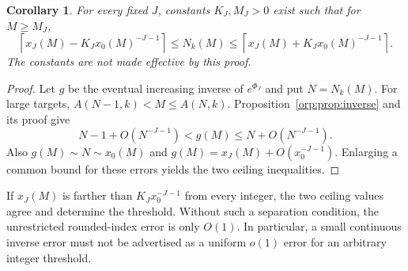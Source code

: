 \documentclass[11pt]{article}
\newtheorem{corollary}[theorem]{Corollary}
\theoremstyle{remark}\newtheorem{remark}[theorem]{Remark}
\begin{document}
\begin{corollary}\label{orp:cor:threshold}
For every fixed $J$, constants $K_J,M_J>0$ exist such that for $M\ge M_J$,
\begin{equation}\label{orp:eq:threshold}
 \left\lceil x_J(M)-K_Jx_0(M)^{-J-1}\right\rceil
 \le N_k(M)\le
 \left\lceil x_J(M)+K_Jx_0(M)^{-J-1}\right\rceil.
\end{equation}
The constants are not made effective by this proof.
\end{corollary}
\begin{proof}
Let $g$ be the eventual increasing inverse of $e^{\Phi_J}$ and put $N=N_k(M)$. For large targets, $A(N-1,k)<M\le A(N,k)$. Proposition~\ref{orp:prop:inverse} and its proof give
\[
 N-1+O(N^{-J-1})<g(M)\le N+O(N^{-J-1}).
\]
Also $g(M)\sim N\sim x_0(M)$ and $g(M)=x_J(M)+O(x_0^{-J-1})$. Enlarging a common bound for these errors yields the two ceiling inequalities.
\end{proof}
If $x_J(M)$ is farther than $K_Jx_0^{-J-1}$ from every integer, the two ceiling values agree and determine the threshold. Without such a separation condition, the unrestricted rounded-index error is only $O(1)$. In particular, a small continuous inverse error must not be advertised as a uniform $o(1)$ error for an arbitrary integer threshold.
\end{document}
